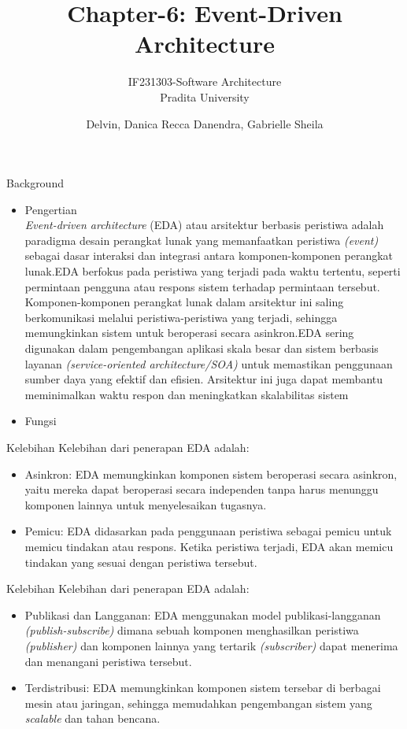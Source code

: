 \documentclass{beamer}
\title{Chapter-6: Event-Driven Architecture}
\subtitle{IF231303-Software Architecture\\Pradita University}
\author{Delvin, Danica Recca Danendra, Gabrielle Sheila}
\begin{document}
	
	\begin{frame}[plain]
		\maketitle
	\end{frame}
	

	
	\begin{frame}{Background}
		\begin{itemize}
			\item Pengertian
			\\\textit{Event-driven architecture} (EDA) atau arsitektur berbasis peristiwa adalah paradigma desain perangkat lunak yang memanfaatkan peristiwa \textit{(event)} sebagai dasar interaksi dan integrasi antara komponen-komponen perangkat lunak.EDA berfokus pada peristiwa yang terjadi pada waktu tertentu, seperti permintaan pengguna atau respons sistem terhadap permintaan tersebut. Komponen-komponen perangkat lunak dalam arsitektur ini saling berkomunikasi melalui peristiwa-peristiwa yang terjadi, sehingga memungkinkan sistem untuk beroperasi secara asinkron.EDA sering digunakan dalam pengembangan aplikasi skala besar dan sistem berbasis layanan \textit{ (service-oriented architecture/SOA)} untuk memastikan penggunaan sumber daya yang efektif dan efisien. Arsitektur ini juga dapat membantu meminimalkan waktu respon dan meningkatkan skalabilitas sistem
			\item Fungsi
		\end{itemize}
	\end{frame}
	
	\begin{frame}{Kelebihan}
		Kelebihan dari penerapan EDA adalah:
		\begin{itemize}
		\item Asinkron: EDA memungkinkan komponen sistem beroperasi secara asinkron, yaitu mereka dapat beroperasi secara independen tanpa harus menunggu komponen lainnya untuk menyelesaikan tugasnya.	
		\item Pemicu: EDA didasarkan pada penggunaan peristiwa sebagai pemicu untuk memicu tindakan atau respons. Ketika peristiwa terjadi, EDA akan memicu tindakan yang sesuai dengan peristiwa tersebut.	
		\end{itemize}
	\end{frame}

		\begin{frame}{Kelebihan}
		Kelebihan dari penerapan EDA adalah:
		\begin{itemize}
		\item Publikasi dan Langganan: EDA menggunakan model publikasi-langganan \textit{(publish-subscribe)} dimana sebuah komponen menghasilkan peristiwa \textit{(publisher)} dan komponen lainnya yang tertarik \textit{(subscriber)} dapat menerima dan menangani peristiwa tersebut.	
		\item Terdistribusi: EDA memungkinkan komponen sistem tersebar di berbagai mesin atau jaringan, sehingga memudahkan pengembangan sistem yang \textit{scalable} dan tahan bencana.
		\end{itemize}
	\end{frame}
	
\end{document}
